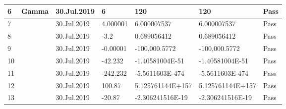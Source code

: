 \documentclass[15pt]{article}
\begin{document}
\begin{CJK*}{UTF8}{gbsn}
{\begin{table}[!htp]
\begin{tabular}{@{}|l|l|l|l|l|l|l|@{}}
6                        & Gamma                            & 30.Jul.2019                    & 6                          & 120                                  & 120                                & Pass                                                                             \\ \midrule
7                        &                                  & 30.Jul.2019                    & 4.000001                   & 6.000007537                          & 6.000007537                        & Pass                                                                             \\ \midrule
8                        &                                  & 30.Jul.2019                    & -3.2                       & 0.689056412                          & 0.689056412                        & Pass                                                                             \\ \midrule
9                        &                                  & 30.Jul.2019                    & -0.00001                   & -100,000.5772                        & -100,000.5772                      & Pass                                                                             \\ \midrule
10                       &                                  & 30.Jul.2019                    & -42.232                    & -1.40581004E-51                      & -1.40581004E-51                    & Pass                                                                             \\ \midrule
11                       &                                  & 30.Jul.2019                    & -242.232                   & -5.5611603E-474                      & -5.5611603E-474                    & Pass                                                                             \\ \midrule
12                       &                                  & 30.Jul.2019                    & 100.87                     & 5.125761144E+157                     & 5.125761144E+157                   & Pass                                                                             \\ \midrule
13                       &                                  & 30.Jul.2019                    & -20.87                     & -2.306241516E-19                     & -2.306241516E-19                   & Pass                                                                             \\ \midrule

\end{tabular}
\end{table}}
\end{CJK*}
\end{document}
